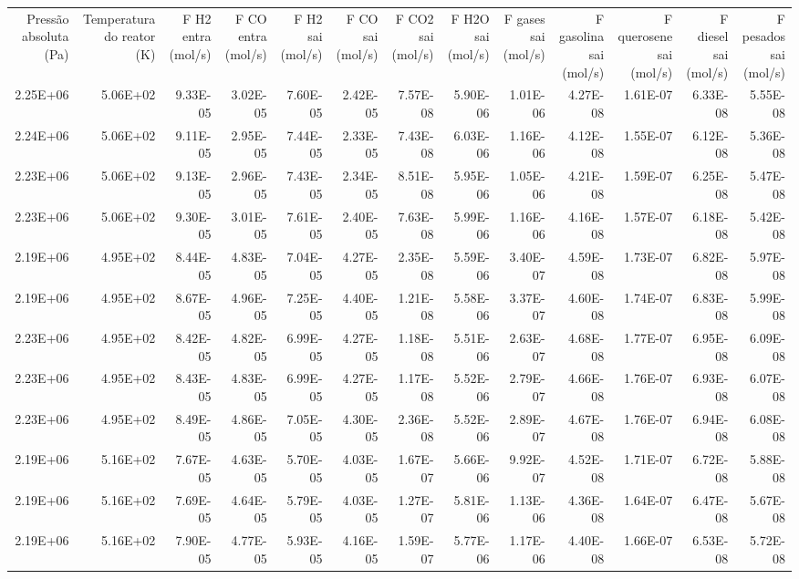 \begin{tabular}{rrrrrrrrrrrrr}
Pressão absoluta (Pa) & Temperatura do reator (K) & F H2 entra (mol/s) & F CO entra (mol/s) & F H2 sai (mol/s) & F CO sai (mol/s) & F CO2 sai (mol/s) & F H2O sai (mol/s) & F gases sai (mol/s) & F gasolina sai (mol/s) & F querosene sai (mol/s) & F diesel sai (mol/s) & F pesados sai (mol/s) \\
2.25E+06 & 5.06E+02 & 9.33E-05 & 3.02E-05 & 7.60E-05 & 2.42E-05 & 7.57E-08 & 5.90E-06 & 1.01E-06 & 4.27E-08 & 1.61E-07 & 6.33E-08 & 5.55E-08 \\
2.24E+06 & 5.06E+02 & 9.11E-05 & 2.95E-05 & 7.44E-05 & 2.33E-05 & 7.43E-08 & 6.03E-06 & 1.16E-06 & 4.12E-08 & 1.55E-07 & 6.12E-08 & 5.36E-08 \\
2.23E+06 & 5.06E+02 & 9.13E-05 & 2.96E-05 & 7.43E-05 & 2.34E-05 & 8.51E-08 & 5.95E-06 & 1.05E-06 & 4.21E-08 & 1.59E-07 & 6.25E-08 & 5.47E-08 \\
2.23E+06 & 5.06E+02 & 9.30E-05 & 3.01E-05 & 7.61E-05 & 2.40E-05 & 7.63E-08 & 5.99E-06 & 1.16E-06 & 4.16E-08 & 1.57E-07 & 6.18E-08 & 5.42E-08 \\
2.19E+06 & 4.95E+02 & 8.44E-05 & 4.83E-05 & 7.04E-05 & 4.27E-05 & 2.35E-08 & 5.59E-06 & 3.40E-07 & 4.59E-08 & 1.73E-07 & 6.82E-08 & 5.97E-08 \\
2.19E+06 & 4.95E+02 & 8.67E-05 & 4.96E-05 & 7.25E-05 & 4.40E-05 & 1.21E-08 & 5.58E-06 & 3.37E-07 & 4.60E-08 & 1.74E-07 & 6.83E-08 & 5.99E-08 \\
2.23E+06 & 4.95E+02 & 8.42E-05 & 4.82E-05 & 6.99E-05 & 4.27E-05 & 1.18E-08 & 5.51E-06 & 2.63E-07 & 4.68E-08 & 1.77E-07 & 6.95E-08 & 6.09E-08 \\
2.23E+06 & 4.95E+02 & 8.43E-05 & 4.83E-05 & 6.99E-05 & 4.27E-05 & 1.17E-08 & 5.52E-06 & 2.79E-07 & 4.66E-08 & 1.76E-07 & 6.93E-08 & 6.07E-08 \\
2.23E+06 & 4.95E+02 & 8.49E-05 & 4.86E-05 & 7.05E-05 & 4.30E-05 & 2.36E-08 & 5.52E-06 & 2.89E-07 & 4.67E-08 & 1.76E-07 & 6.94E-08 & 6.08E-08 \\
2.19E+06 & 5.16E+02 & 7.67E-05 & 4.63E-05 & 5.70E-05 & 4.03E-05 & 1.67E-07 & 5.66E-06 & 9.92E-07 & 4.52E-08 & 1.71E-07 & 6.72E-08 & 5.88E-08 \\
2.19E+06 & 5.16E+02 & 7.69E-05 & 4.64E-05 & 5.79E-05 & 4.03E-05 & 1.27E-07 & 5.81E-06 & 1.13E-06 & 4.36E-08 & 1.64E-07 & 6.47E-08 & 5.67E-08 \\
2.19E+06 & 5.16E+02 & 7.90E-05 & 4.77E-05 & 5.93E-05 & 4.16E-05 & 1.59E-07 & 5.77E-06 & 1.17E-06 & 4.40E-08 & 1.66E-07 & 6.53E-08 & 5.72E-08 \\

\end{tabular}
